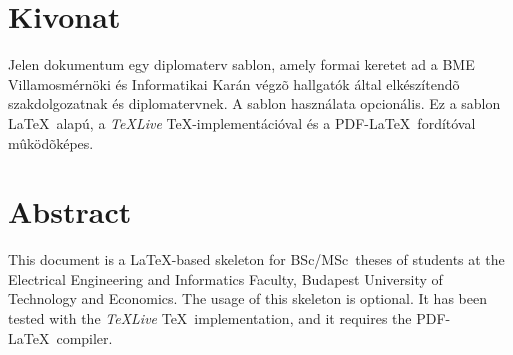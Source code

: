 \chapter*{Kivonat}

Jelen dokumentum egy diplomaterv sablon, amely formai keretet ad a BME Villamosmérnöki és Informatikai Karán végzõ hallgatók által elkészítendõ szakdolgozatnak és diplomatervnek. A sablon használata opcionális. Ez a sablon \LaTeX~alapú, a \emph{TeXLive} \TeX-implementációval és a PDF-\LaTeX~fordítóval mûködõképes.
\vfill

\chapter*{Abstract}

This document is a \LaTeX-based skeleton for BSc/MSc~theses of students at the Electrical Engineering and Informatics Faculty, Budapest University of Technology and Economics. The usage of this skeleton is optional. It has been tested with the \emph{TeXLive} \TeX~implementation, and it requires the PDF-\LaTeX~compiler.
\vfill
